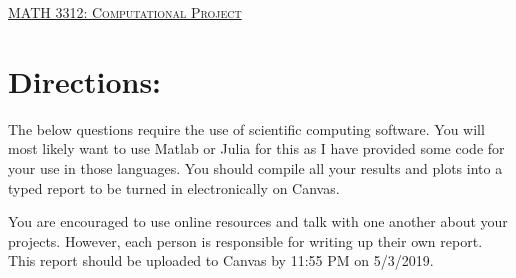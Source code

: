 \documentclass[11pt, a4paper]{article}
\renewcommand*{\arraystretch}{.5}
\begin{document}
\begin{center}
{\Large \underline{\textsc{MATH 3312:  Computational Project}}}
\end{center}


\section*{Directions:}
The below questions require the use of scientific computing software. You will most likely want to use Matlab or Julia for this as I have provided some code for your use in those languages. You should compile all your results and plots into a typed report to be turned in electronically on Canvas. 

You are encouraged to use online resources and talk with one another about your projects. However, each person is responsible for writing up their own report. This report should be uploaded to Canvas by 11:55 PM on 5/3/2019. 
\end{document}
